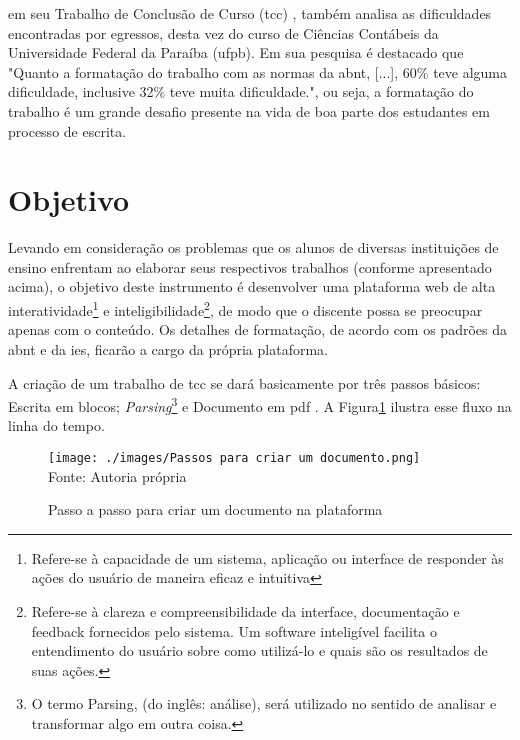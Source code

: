 \clearpage

\cite{santos}
em seu Trabalho de Conclusão de Curso
(\acrshort{tcc})
, também analisa as
dificuldades encontradas por egressos, desta vez do curso de Ciências Contábeis da
Universidade Federal da Paraíba
(\acrshort{ufpb}).
Em sua pesquisa é destacado que "Quanto a
formatação do trabalho com as normas da 
\acrshort{abnt}, [...], 60\% teve alguma dificuldade, inclusive
32\% teve muita dificuldade.", ou seja, a formatação do trabalho é um grande desafio presente
na vida de boa parte dos estudantes em processo de escrita.

\section{Objetivo}

Levando em consideração os problemas que os alunos de diversas instituições de ensino enfrentam ao elaborar seus respectivos
trabalhos (conforme apresentado acima), o objetivo deste instrumento é desenvolver uma plataforma web de alta
interatividade\footnote{Refere-se à capacidade de um sistema, aplicação ou interface de responder
        às ações do usuário de maneira eficaz e intuitiva}
e
inteligibilidade\footnote{Refere-se à clareza e compreensibilidade da interface, documentação e feedback fornecidos pelo
    sistema. Um software inteligível facilita o entendimento do usuário sobre como utilizá-lo e quais são os resultados de suas ações.},
de modo que o discente possa se preocupar apenas com o conteúdo. Os detalhes de formatação, de acordo com os padrões da
\acrshort{abnt}
e da
\acrshort{ies},
ficarão a cargo da própria plataforma.

A criação de um trabalho de
\acrshort{tcc}
se dará basicamente por três passos básicos: Escrita em blocos;
\textit{Parsing}\footnote{O termo Parsing, (do inglês: análise), será utilizado no
sentido de analisar e transformar algo em outra coisa.}
e
Documento em
\acrshort{pdf}
. A Figura\ref{fig:Passos para criar um documento} ilustra esse fluxo na linha do tempo.

\begin{figure}[ht]
    \centering
    \caption{Passo a passo para criar um documento na plataforma}
    \texttt{[image: ./images/Passos para criar um documento.png]}
    \label{fig:Passos para criar um documento} \\
    \textnormal{\fontsize{10pt}{12pt}Fonte: Autoria própria}
\end{figure}


